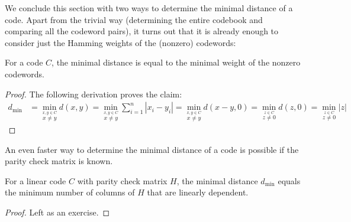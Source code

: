 We conclude this section with two ways to determine the minimal distance of a code. Apart from the trivial way (determining the entire codebook and comparing all the codeword pairs), it turns out that it is already enough to consider just the Hamming weights of the (nonzero) codewords:


\begin{proposition}
For a code $C$, the minimal distance is equal to the minimal weight of the nonzero codewords.
\end{proposition}
\begin{proof}
The following derivation proves the claim:
\begin{align}
d_{\min} &= \min_{\stackrel{x,y \in C}{x \neq y}} d(x,y) 
= \min_{\stackrel{x,y \in C}{x \neq y}} \sum_{i=1}^n |x_i - y_i| 
= \min_{\stackrel{x,y \in C}{x \neq y}} d(x-y,0)
= \min_{\stackrel{z \in C}{z \neq 0}} d(z,0)
= \min_{\stackrel{z \in C}{z \neq 0}} |z|
\end{align}
\end{proof}

An even faster way to determine the minimal distance of a code is possible if the parity check matrix is known.

\begin{proposition}
For a linear code $C$ with parity check matrix $H$, the minimal distance $d_{\min}$ equals the minimum number of columns of $H$ that are linearly dependent.
\end{proposition}
\begin{proof}
Left as an exercise.
\end{proof}